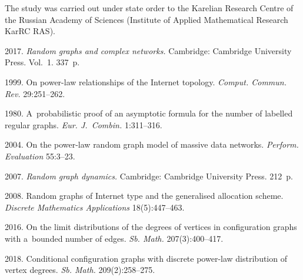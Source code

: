


\Ack
\noindent
The study was carried out under state order to the Karelian Research Centre 
of the Russian Academy of Sciences
(Institute of Applied Mathematical Research KarRC RAS).

\vspace*{12pt}

  \begin{multicols}{2}

\renewcommand{\bibname}{\protect\rmfamily References}

{\small\frenchspacing
 {%
 \begin{thebibliography}{99}

 2017. 
\textit{Random graphs and complex networks.} Cambridge:
Cambridge University Press.  Vol.~1. 337~p.

 1999. On power-law relationships of the Internet topology. 
 \textit{Comput. Commun. Rev.} 29:251--262.

 1980. A~probabilistic proof of an asymptotic formula for the number
of labelled regular graphs. \textit{Eur. J.~Combin.} 1:311--316.

 2004. On the power-law random graph model of massive data
networks. \textit{Perform. Evaluation} 55:3--23.

 2007. \textit{Random graph dynamics.} Cambridge:
Cambridge University Press. 212~p.

 2008. 
Random graphs of Internet type and the generalised allocation scheme.
\textit{Discrete Mathematics Applications} 18(5):447--463.

2016. On the limit distributions of the degrees of vertices in configuration graphs with 
a~bounded number of edges. 
\textit{Sb. Math.} 207(3):400--417.

 2018. 
Conditional configuration graphs with discrete power-law distribution of vertex degrees. 
\textit{Sb. Math.} 209(2):258--275.


\end{thebibliography}}}
\end{multicols}
